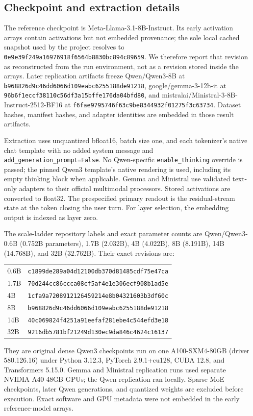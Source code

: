 \documentclass{article}
\begin{document}
\subsection{Checkpoint and extraction details}

The reference checkpoint is Meta-Llama-3.1-8B-Instruct. Its early activation
arrays contain activations but not embedded provenance; the sole local cached
snapshot used by the project resolves to
\nolinkurl{0e9e39f249a16976918f6564b8830bc894c89659}. We therefore report that
revision as reconstructed from the run environment, not as a revision stored
inside the arrays. Later replication artifacts freeze Qwen/Qwen3-8B at
\nolinkurl{b968826d9c46dd6066d109eabc6255188de91218},
google/gemma-3-12b-it at
\nolinkurl{96b6f1eccf38110c56df3a15bffe176da04bfd80}, and
mistralai/Ministral-3-8B-Instruct-2512-BF16 at
\nolinkurl{f6fae9795746f63c9be8344932f01275f3c63734}. Dataset hashes, manifest
hashes, and adapter identities are embedded in those result artifacts.

Extraction uses unquantized bfloat16, batch size one, and each tokenizer's
native chat template with no added system message and
\texttt{add\_generation\_prompt=False}. No Qwen-specific
\texttt{enable\_thinking} override is passed; the pinned Qwen3 template's
native rendering is used, including its empty thinking block when applicable.
Gemma and Ministral use validated text-only adapters to their official
multimodal processors. Stored activations are converted to float32. The
prespecified primary readout is the residual-stream state at the token closing
the user turn. For layer selection, the embedding output is indexed as layer
zero.

The scale-ladder repository labels and exact parameter counts are Qwen/Qwen3-
0.6B (0.752B parameters), 1.7B (2.032B), 4B (4.022B), 8B (8.191B), 14B
(14.768B), and 32B (32.762B). Their exact revisions are:
\begin{center}
\footnotesize
\begin{tabular}{ll}
0.6B & \texttt{c1899de289a04d12100db370d81485cdf75e47ca} \\
1.7B & \texttt{70d244cc86ccca08cf5af4e1e306ecf908b1ad5e} \\
4B & \texttt{1cfa9a7208912126459214e8b04321603b3df60c} \\
8B & \texttt{b968826d9c46dd6066d109eabc6255188de91218} \\
14B & \texttt{40c069824f4251a91eefaf281ebe4c544efd3e18} \\
32B & \texttt{9216db5781bf21249d130ec9da846c4624c16137}
\end{tabular}
\end{center}
They are original dense Qwen3 checkpoints run on one A100-SXM4-80GB (driver
580.126.16) under Python
3.12.3, PyTorch 2.9.1+cu128, CUDA 12.8, and Transformers 5.15.0. Gemma and
Ministral replication runs used separate NVIDIA A40 48GB GPUs; the Qwen
replication ran locally. Sparse MoE checkpoints, later Qwen generations, and
quantized weights are excluded before execution. Exact software and GPU
metadata were not embedded in the early reference-model arrays.
\end{document}
